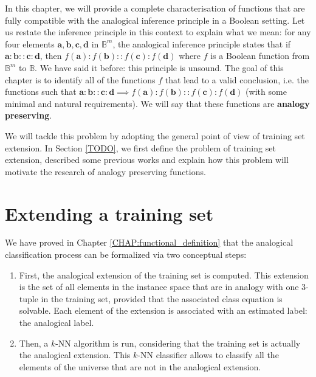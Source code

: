 In this chapter, we will provide a complete characterisation of functions that
are fully compatible with the analogical inference principle in a Boolean
setting. Let us restate the inference principle in this context to explain what
we mean: for any four elements $\mathbf{a}, \mathbf{b}, \mathbf{c}, \mathbf{d}$
in $\mathbb{B}^m$, the analogical inference principle states that if
$\mathbf{a}: \mathbf{b}:: \mathbf{c}: \mathbf{d}$, then $f(\mathbf{a}):
f(\mathbf{b}):: f(\mathbf{c}): f(\mathbf{d})$ where $f$ is a Boolean function
from $\mathbb{B}^m$ to $\mathbb{B}$. We have said it before:  this principle is
unsound. The goal of this chapter is to identify all of the functions $f$ that
lead to a valid conclusion, i.e. the functions such that $\mathbf{a}:
\mathbf{b}:: \mathbf{c}: \mathbf{d} \implies f(\mathbf{a}):f(\mathbf{b})::
f(\mathbf{c}): f(\mathbf{d})$ (with some minimal and natural requirements). We
will say that these functions are \textbf{analogy preserving}.

We will tackle this problem by adopting the general point of view of training
set extension. In Section \ref{TODO}, we first define the problem of training
set extension, described some previous works and explain how this problem will
motivate the research of analogy preserving functions.

\section{Extending a training set}

We have proved in Chapter \ref{CHAP:functional_definition} that the analogical
classification process can be formalized via two conceptual steps:
\begin{enumerate}
  \item First, the analogical extension of the training set is computed. This
    extension is the set of all elements in the instance space that are in
    analogy with one $3$-tuple in the training set, provided that the
    associated class equation is solvable. Each element of the extension is
    associated with an estimated label: the analogical label.
  \item Then, a $k$-NN algorithm is run, considering that the training set is
    actually the analogical extension. This $k$-NN classifier allows to
    classify all the elements of the universe that are not in the analogical
    extension.
\end{enumerate}

